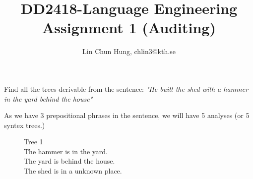 \documentclass[12pt]{article}
\newenvironment{problem}[2][Problem]{\begin{trivlist}
\item[\hskip \labelsep {\bfseries #1}\hskip \labelsep {\bfseries #2.}]}{\end{trivlist}}
\begin{document}
\title{DD2418-Language Engineering Assignment 1 (Auditing)}
\author{Lin Chun Hung, chlin3@kth.se}
\maketitle

\begin{problem}{1.1}
Find all the trees derivable from the sentence:
\emph{"He built the shed with a hammer in the yard behind the house"}

As we have 3 prepositional phrases in the sentence, we will have 5 analyses (or
5 syntex trees.)

\begin{figure}[!hb]
   \centering
   \captionsetup{justification=centering}
   \caption{ Tree 1 \\
      The hammer is in the yard.\\
      The yard is behind the house.\\
      The shed is in a unknown place.
}
\end{figure}
\end{problem}
\end{document}

